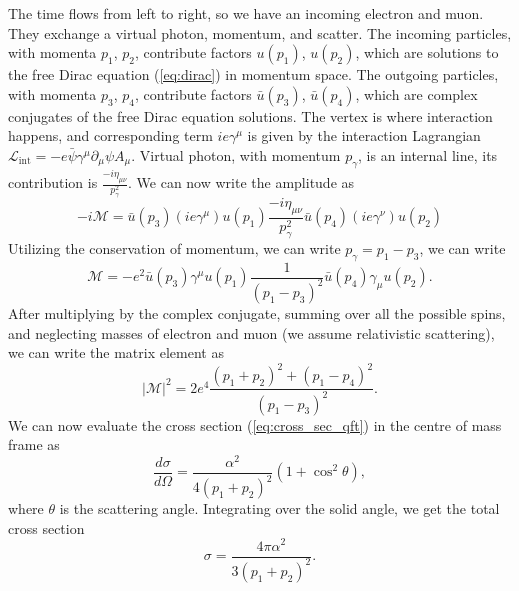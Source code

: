 The time flows from left to right, so we have an incoming electron and muon. 
They exchange a virtual photon, momentum, and scatter.
The incoming particles, with momenta $p_1$, $p_2$, contribute factors $u(p_1)$, $u(p_2)$, which are solutions to the free Dirac equation (\ref{eq:dirac}) in momentum space. 
The outgoing particles, with momenta $p_3$, $p_4$, contribute factors $\bar{u}(p_3)$, $\bar{u}(p_4)$, which are complex conjugates of the free Dirac equation solutions.
The vertex is where interaction happens, and corresponding term $ie\gamma^\mu$ is given by the interaction Lagrangian $\mathcal{L}_{\text{int}} = - e \bar{\psi} \gamma^\mu \partial_\mu \psi A_\mu$.
Virtual photon, with momentum $p_{\gamma}$, is an internal line, its contribution is $\frac{-i\eta_{\mu \nu}}{p_{\gamma}^2}$.
We can now write the amplitude as 
\begin{equation}
    \label{eq:e_mu_amp}
    -i\mathcal{M} = \bar{u}(p_3) (ie\gamma^\mu) u(p_1) \frac{-i\eta_{\mu \nu}}{p_{\gamma}^2} \bar{u}(p_4) (ie\gamma^\nu) u(p_2)
\end{equation}
Utilizing the conservation of momentum, we can write $p_{\gamma} = p_1 - p_3$, we can write
\begin{equation}
    \label{eq:e_mu_amp_2}
    \mathcal{M} = -e^2 \bar{u}(p_3) \gamma^\mu u(p_1) \frac{1}{(p_1 - p_3)^2} \bar{u}(p_4) \gamma_\mu u(p_2).
\end{equation}
After multiplying by the complex conjugate, summing over all the possible spins, and neglecting masses of electron and muon (we assume relativistic scattering), we can write the matrix element as
\begin{equation}
    |\mathcal{M}|^2 = 2e^4\frac{(p_1 + p_2)^2 + (p_1 - p_4)^2}{(p_1 - p_3)^2}.
\end{equation}
We can now evaluate the cross section (\ref{eq:cross_sec_qft}) in the centre of mass frame as
\begin{equation}
    \label{eq:cross_sec_qft_2}
    \frac{d\sigma}{d\Omega} = \frac{\alpha^2}{4(p_1 + p_2)^2} (1+\cos^2{\theta}),
\end{equation}
where $\theta$ is the scattering angle.
Integrating over the solid angle, we get the total cross section
\begin{equation}
    \sigma =  \frac{4\pi\alpha^2}{3(p_1 + p_2)^2}.
\end{equation}

